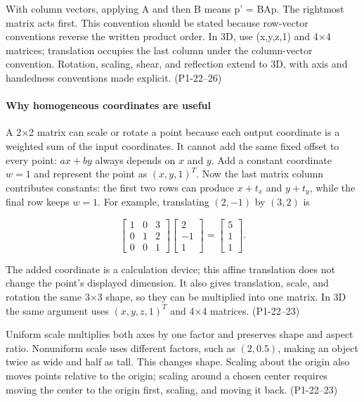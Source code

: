 With column vectors, applying A and then B means p' = BAp. The rightmost matrix acts first. This convention should be stated because row-vector conventions reverse the written product order. In 3D, use (x,y,z,1) and 4×4 matrices; translation occupies the last column under the column-vector convention. Rotation, scaling, shear, and reflection extend to 3D, with axis and handedness conventions made explicit. (P1-22--26)

\paragraph{Why homogeneous coordinates are useful}\label{03-visual-computing-i-ch001-why-homogeneous-coordinates-are-useful}

\hypertarget{03-visual-computing-i-ch001-why-homogeneous-coordinates-are-useful}{}

A 2×2 matrix can scale or rotate a point because each output coordinate is a weighted sum of the input coordinates. It cannot add the same fixed offset to every point: \(ax+by\) always depends on \(x\) and \(y\). Add a constant coordinate \(w=1\) and represent the point as \((x,y,1)^T\). Now the last matrix column contributes constants: the first two rows can produce \(x+t_x\) and \(y+t_y\), while the final row keeps \(w=1\). For example, translating \((2,-1)\) by \((3,2)\) is

\[
\begin{bmatrix}1&0&3\\0&1&2\\0&0&1\end{bmatrix}
\begin{bmatrix}2\\-1\\1\end{bmatrix}
=
\begin{bmatrix}5\\1\\1\end{bmatrix}.
\]

The added coordinate is a calculation device; this affine translation does not change the point's displayed dimension. It also gives translation, scale, and rotation the same 3×3 shape, so they can be multiplied into one matrix. In 3D the same argument uses \((x,y,z,1)^T\) and 4×4 matrices. (P1-22--23)

Uniform scale multiplies both axes by one factor and preserves shape and aspect ratio. Nonuniform scale uses different factors, such as \((2,0.5)\), making an object twice as wide and half as tall. This changes shape. Scaling about the origin also moves points relative to the origin; scaling around a chosen center requires moving the center to the origin first, scaling, and moving it back. (P1-22--23)

